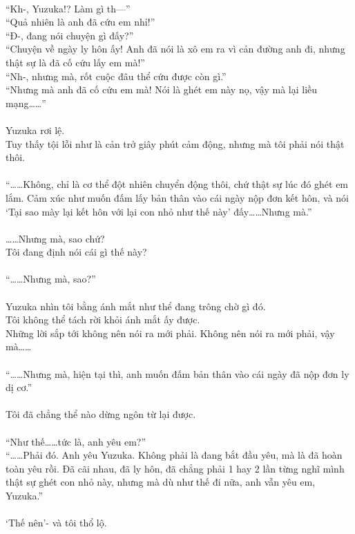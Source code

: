 \documentclass[12pt,a4paper, twosides]{book}
\begin{document}
\\
“Kh-, Yuzuka!? Làm gì th—”\\
“Quả nhiên là anh đã cứu em nhỉ!”\\
“Đ-, đang nói chuyện gì đấy?”\\
“Chuyện về ngày ly hôn ấy! Anh đã nói là xô em ra vì cản đường anh đi, nhưng thật sự là đã cố cứu lấy em mà!”\\
“Nh-, nhưng mà, rốt cuộc đâu thể cứu được còn gì.”\\
“Nhưng mà anh đã cố cứu em mà! Nói là ghét em này nọ, vậy mà lại liều mạng……”\\
\\
Yuzuka rơi lệ.\\
Tuy thấy tội lỗi như là cản trở giây phút cảm động, nhưng mà tôi phải nói thật thôi.\\
\\
“……Không, chỉ là cơ thể đột nhiên chuyển động thôi, chứ thật sự lúc đó ghét em lắm. Cảm xúc như muốn đấm lấy bản thân vào cái ngày nộp đơn kết hôn, và nói ‘Tại sao mày lại kết hôn với lại con nhỏ như thế này’ đấy……Nhưng mà.”\\
\\
……Nhưng mà, sao chứ?\\
Tôi đang định nói cái gì thế này?\\
\\
“……Nhưng mà, sao?”\\
\\
Yuzuka nhìn tôi bằng ánh mắt như thể đang trông chờ gì đó.\\
Tôi không thể tách rời khỏi ánh mắt ấy được.\\
Những lời sắp tới không nên nói ra mới phải. Không nên nói ra mới phải, vậy mà……\\
\\
“……Nhưng mà, hiện tại thì, anh muốn đấm bản thân vào cái ngày đã nộp đơn ly dị cơ.”\\
\\
Tôi đã chẳng thể nào dừng ngôn từ lại được.\\
\\
“Như thế……tức là, anh yêu em?”\\
“……Phải đó. Anh yêu Yuzuka. Không phải là đang bắt đầu yêu, mà là đã hoàn toàn yêu rồi. Đã cãi nhau, đã ly hôn, đã chẳng phải 1 hay 2 lần từng nghĩ mình thật sự ghét con nhỏ này, nhưng mà dù như thế đi nữa, anh vẫn yêu em, Yuzuka.”\\
\\
‘Thế nên’- và tôi thổ lộ.\\
\end{document}
